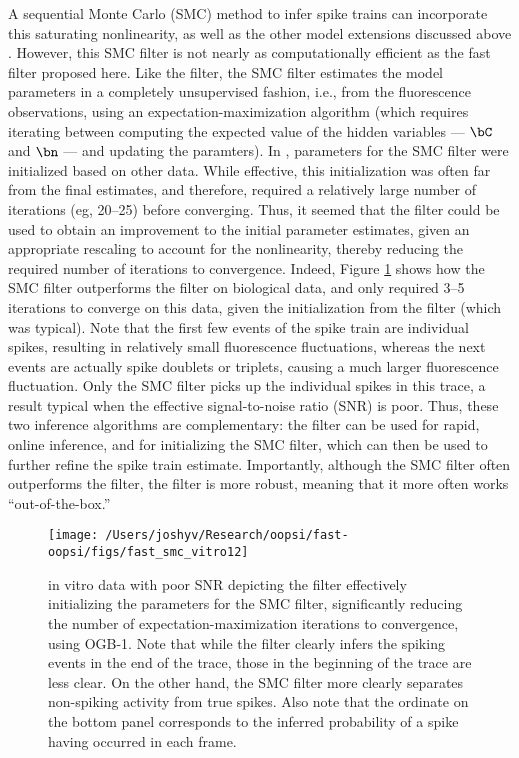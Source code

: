 A sequential Monte Carlo (SMC) method to infer spike trains can incorporate this saturating nonlinearity, as well as the other model extensions discussed above \cite{VogelsteinPaninski09} . However, this SMC filter is not nearly as computationally efficient as the fast filter proposed here.  Like the \foopsi filter, the SMC filter estimates the model parameters in a completely unsupervised fashion, i.e.,  from the fluorescence observations, using an expectation-maximization algorithm (which requires iterating between computing the expected value of the hidden variables --- $\bC$ and $\bn$ --- and updating the paramters).  In \cite{VogelsteinPaninski09}, parameters for the SMC filter were initialized based on other data.  While effective, this initialization was often far from the final estimates, and therefore, required a relatively large number of iterations (eg, 20--25) before converging.  Thus, it seemed that the \foopsi filter could be used to obtain an improvement to the initial parameter estimates, given an appropriate rescaling to account for the nonlinearity, thereby reducing the required number of iterations to convergence.  Indeed, Figure \ref{fig:smc_init} shows how the SMC filter outperforms the \foopsi filter on biological data, and only required 3--5 iterations to converge on this data, given the initialization from the \foopsi filter (which was typical).  Note that the first few events of the spike train are individual spikes, resulting in relatively small fluorescence fluctuations, whereas the next events are actually spike doublets or triplets, causing a much larger fluorescence fluctuation.  Only the SMC filter picks up the individual spikes in this trace, a result typical when the effective signal-to-noise ratio (SNR) is poor.  Thus, these two inference algorithms are complementary: the \foopsi filter can be used for rapid, online inference, and for initializing the SMC filter, which can then be used to further refine the spike train estimate.  Importantly, although the SMC filter often outperforms the \foopsi filter, the \foopsi filter is more robust, meaning that it more often works ``out-of-the-box.''

\begin{figure}[h!]
\centering \texttt{[image: /Users/joshyv/Research/oopsi/fast-oopsi/figs/fast\_smc\_vitro12]}
\caption[\foopsi filter can initialize Wiener filter]{in vitro data with poor SNR depicting the \foopsi filter effectively initializing the parameters for the SMC filter, significantly reducing the number of expectation-maximization iterations to convergence, using OGB-1.  Note that while the \foopsi filter clearly infers the spiking events in the end of the trace, those in the beginning of the trace are less clear.  On the other hand, the SMC filter more clearly separates non-spiking activity from true spikes.  Also note that the ordinate on the bottom panel corresponds to the inferred probability of a spike having occurred in each frame.} \label{fig:smc_init}
\end{figure}

